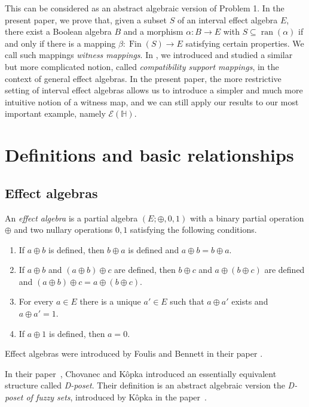 \documentclass[letterpaper]{amsart}
\theoremstyle{definition}
\DeclareMathOperator*\Fin{Fin}
\DeclareMathOperator*\ran{ran}
\begin{document}
This can be considered as an abstract algebraic version of Problem 1.  In the
present paper, we prove that, given a subset $S$ of an interval effect algebra
$E$, there exist a Boolean algebra $B$ and a morphism $\alpha:B\to E$ with
$S\subseteq\ran(\alpha)$ if and only if there is a mapping $\beta:\Fin(S)\to
E$ satisfying certain properties.  We call such mappings {\em witness
mappings}.
In \cite{Jen:CSMiEA}, we introduced and studied a similar but 
more complicated notion, called {\em compatibility support mappings}, 
in the context of general effect algebras.
In the present paper, the more restrictive setting of interval effect algebras
allows us to introduce a simpler and much more intuitive notion of a witness
map, and we can still apply our results to our most important example, namely
$\mathcal E(\mathbb H)$.

\section{Definitions and basic relationships}

\subsection{Effect algebras}

An {\em effect algebra} 
is a partial algebra $(E;\oplus,0,1)$ with a binary 
partial operation $\oplus$ and two nullary operations $0,1$ satisfying
the following conditions.
\begin{enumerate}
\item[(E1)]If $a\oplus b$ is defined, then $b\oplus a$ is defined and
		$a\oplus b=b\oplus a$.
\item[(E2)]If $a\oplus b$ and $(a\oplus b)\oplus c$ are defined, then
		$b\oplus c$ and $a\oplus(b\oplus c)$ are defined and
		$(a\oplus b)\oplus c=a\oplus(b\oplus c)$.
\item[(E3)]For every $a\in E$ there is a unique $a'\in E$ such that
		$a\oplus a'$ exists and $a\oplus a'=1$.
\item[(E4)]If $a\oplus 1$ is defined, then $a=0$.
\end{enumerate}

Effect algebras were introduced by Foulis and Bennett in their paper 
\cite{FouBen:EAaUQL}.

In their paper~\cite{KopCho:DP}, Chovanec and K\^ opka introduced
an essentially equivalent structure called {\em D-poset}. Their definition
is an abstract algebraic version the {\em D-poset of fuzzy sets},
introduced by K\^ opka in the paper~\cite{Kop:DPFS}.
\end{document}
